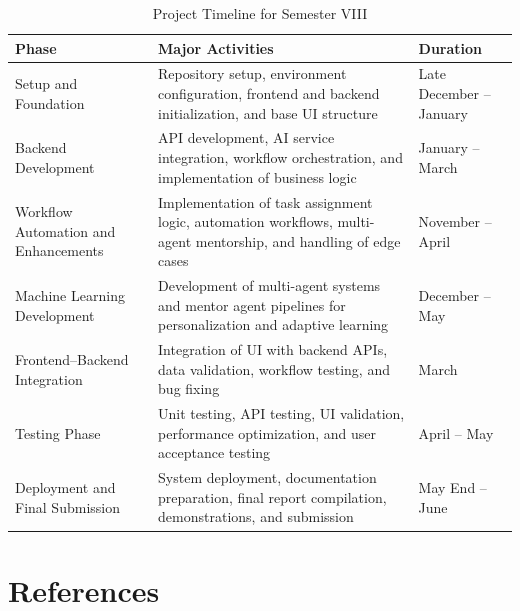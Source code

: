 \documentclass[12pt,a4paper]{report}
\begin{document}
\begin{table}[H]
\centering
\caption{Project Timeline for Semester VIII}
\label{tab:timeline_sem8}
\begin{tabular}{|p{4cm}|p{8cm}|p{3cm}|}
\hline
\textbf{Phase} & \textbf{Major Activities} & \textbf{Duration} \\
\hline
Setup and Foundation &
Repository setup, environment configuration, frontend and backend initialization, and
base UI structure &
Late December -- January \\
\hline
Backend Development &
API development, AI service integration, workflow orchestration, and implementation of
business logic &
January -- March \\
\hline
Workflow Automation and Enhancements &
Implementation of task assignment logic, automation workflows, multi-agent mentorship,
and handling of edge cases &
November -- April \\
\hline
Machine Learning Development &
Development of multi-agent systems and mentor agent pipelines for personalization and
adaptive learning &
December -- May \\
\hline
Frontend--Backend Integration &
Integration of UI with backend APIs, data validation, workflow testing, and bug fixing &
March \\
\hline
Testing Phase &
Unit testing, API testing, UI validation, performance optimization, and user acceptance
testing &
April -- May \\
\hline
Deployment and Final Submission &
System deployment, documentation preparation, final report compilation, demonstrations,
and submission &
May End -- June \\
\hline
\end{tabular}
\end{table}

\newpage
\chapter*{References}
\end{document}
